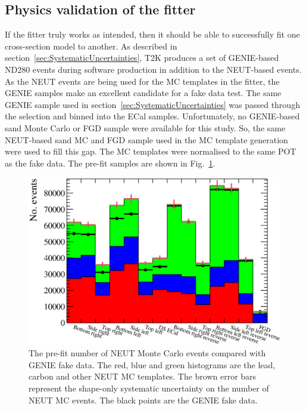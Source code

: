 \subsection{Physics validation of the fitter}
\label{subsec:PhysicsFitterValidation}
If the fitter truly works as intended, then it should be able to successfully fit one cross-section model to another.  As described in section~\ref{sec:SystematicUncertainties}, T2K produces a set of GENIE-based ND280 events during software production in addition to the NEUT-based events.  As the NEUT events are being used for the MC templates in the fitter, the GENIE samples make an excellent candidate for a fake data test.
\newline
\newline 
The same GENIE sample used in section~\ref{sec:SystematicUncertainties} was passed through the selection and binned into the ECal samples.  Unfortunately, no GENIE-based sand Monte Carlo or FGD sample were available for this study.  So, the same NEUT-based sand MC and FGD sample used in the MC template generation were used to fill this gap.  The MC templates were normalised to the same POT as the fake data.  The pre-fit samples are shown in Fig.~\ref{fig:MCTemplatesWithSystematicsGenieDataPreFit}.
\begin{figure}
  \centering
  \includegraphics[width=15cm]{images/measurement/validation/genie/MCTemplatesWithSystematics_GenieData_PreFit.eps}
  \caption{The pre-fit number of NEUT Monte Carlo events compared with GENIE fake data.  The red, blue and green histograms are the lead, carbon and other NEUT MC templates.  The brown error bars represent the shape-only systematic uncertainty on the number of NEUT MC events.  The black points are the GENIE fake data.}
  \label{fig:MCTemplatesWithSystematicsGenieDataPreFit}
\end{figure}
